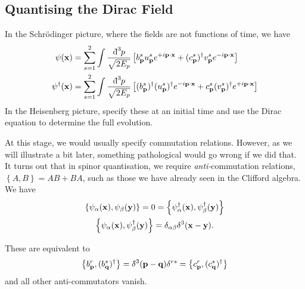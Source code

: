 \subsection{Quantising the Dirac Field}%
\label{sub:quantising_the_dirac_field}

In the Schrödinger picture, where the fields are not functions of time, we have
\begin{align}
  \psi(\vb{x}) &= \sum_{s=1}^{2} \int \frac{\bdd[3]{p}}{\sqrt{2E_{p}}} \left[ b_{\vb{p}}^{s} u^{s}_{\vb{p}} e^{+i \vb{p} \cdot \vb{x}} + (c_{\vb{p}}^{s})^{\dagger} v_{\vb{p}}^{s} e^{-i \vb{p} \cdot \vb{x}} \right] \\
  \psi^{\dagger}(\vb{x}) &= \sum_{s=1}^{2} \int \frac{\bdd[3]{p}}{\sqrt{2E_{p}}} \left[ (b_{\vb{p}}^{s})^{\dagger} (u^{s}_{\vb{p}})^{\dagger} e^{-i \vb{p} \cdot \vb{x}} + c_{\vb{p}}^{s} (v_{\vb{p}}^{s})^{\dagger} e^{+i \vb{p} \cdot \vb{x}} \right] \\
\end{align}
In the Heisenberg picture, specify these at an initial time and use the Dirac equation to determine the full evolution.

At this stage, we would usually specify commutation relations. However, as we will illustrate a bit later, something pathological would go wrong if we did that.
It turns out that in spinor quantisation, we require \emph{anti-}commutation relations, $\left\{ A, B \right\} = AB + BA$, such as those we have already seen in the Clifford algebra.
We have
\begin{subequations} \label{eq:16-anticommrels}
  \begin{gather}
    \left\{ \psi_{\alpha}(\vb{x}), \psi_{\beta}(\vb{y}) \right\} = 0 = \left\{ \psi^{\dagger}_{\alpha}(\vb{x}), \psi^{\dagger}_{\beta}(\vb{y}) \right\} \\
    \left\{ \psi_{\alpha}(\vb{x}) , \psi^{\dagger}_{\beta}(\vb{y}) \right\} = \delta_{\alpha\beta} \delta^3 (\vb{x} - \vb{y}).
  \end{gather}
\end{subequations}
\begin{claim}
  These are equivalent to
  \begin{equation}
    \left\{ b_{\vb{p}}^{r}, (b^{s}_{\vb{q}})^{\dagger} \right\} = \bdelta^3(\vb{p} - \vb{q}) \delta^{rs} = \left\{ c^{r}_{\vb{p}}, (c_{\vb{q}}^{s})^{\dagger} \right\}
  \end{equation}
  and all other anti-commutators vanish.
\end{claim}

